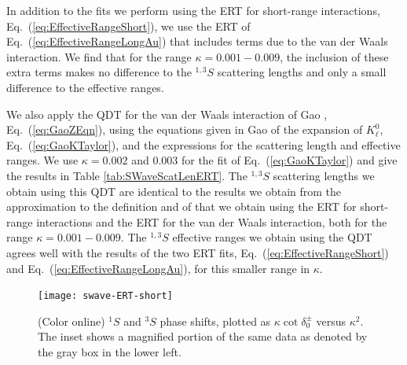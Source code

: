 \documentclass[preprint,showpacs,showkeys,preprintnumbers,amsmath,amssymb,longbibliography,pra,aps]{revtex4-1}
\begin{document}
{In addition to the fits we perform using the ERT for short-range interactions,
Eq.~(\ref{eq:EffectiveRangeShort}), we use the ERT of Eq.~(\ref{eq:EffectiveRangeLongAu})
that includes terms due to the van der Waals interaction. We find
that for the range $\kappa = 0.001 - 0.009$, the inclusion of these extra terms
makes no difference to the $^{1,3}S$ scattering lengths and only a
small difference to the effective ranges.

We also apply the QDT for the van der Waals interaction of Gao
\cite{Gao1998}, Eq.~(\ref{eq:GaoZEqn}), using the equations given in
Gao \cite{Gao1998a} of the expansion of $K_\ell^0$, Eq.~(\ref{eq:GaoKTaylor}),
and the expressions for the scattering length and effective ranges. We use
$\kappa = 0.002$ and $0.003$ for the fit of Eq.~(\ref{eq:GaoKTaylor}) and 
give the results in Table \ref{tab:SWaveScatLenERT}. The $^{1,3}S$
scattering lengths we obtain using this QDT are
identical to the results we obtain from the approximation to the definition
and of that we obtain using the ERT for short-range 
interactions and the ERT for the van der Waals interaction, both for the
range $\kappa = 0.001 - 0.009$. The $^{1,3}S$ effective ranges we obtain using
the QDT agrees well with the results of the two ERT fits, Eq.~(\ref{eq:EffectiveRangeShort}) and
Eq.~(\ref{eq:EffectiveRangeLongAu}), for this smaller range in $\kappa$.

\begin{figure}[H]
	\centering
	\texttt{[image: swave-ERT-short]}
	\caption{(Color online) $^1S$ and $^3S$ phase shifts, plotted as
$\kappa \cot \delta_0^\pm$ versus $\kappa^2$. The inset shows a magnified
portion of the same data as denoted by the gray box in the lower left.}
	\label{fig:swave-ERT-short}
\end{figure}

}
\end{document}
